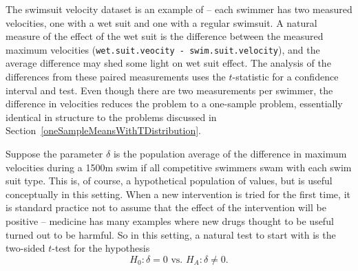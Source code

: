 The swimsuit velocity dataset is an example of  -- each swimmer has two measured velocities, one with a wet suit and one with a regular swimsuit.  A natural measure of the effect of the wet suit is the difference between the measured maximum velocities (\texttt{wet.suit.veocity - swim.suit.velocity}), and the average difference may shed some light on wet suit effect.  The analysis of the differences from these paired measurements uses the $t$-statistic for a confidence interval and test.  Even though there are two measurements per swimmer, the difference in velocities reduces the problem to a one-sample problem, essentially identical in structure to the problems discussed in Section~\ref{oneSampleMeansWithTDistribution}.

Suppose the parameter $\delta$ is the population average of the difference in maximum velocities during a 1500m swim if all competitive swimmers swam with each swim suit type.  This is, of course, a hypothetical population of values, but is useful conceptually in this setting.  When a new intervention is tried for the first time, it is standard practice not to assume that the effect of the intervention will be positive  -- medicine has many examples where new drugs thought to be useful turned out to be harmful.  So in this setting, a natural test to start with is the two-sided $t$-test for the hypothesis
\[
    H_0: \delta = 0 \text{  vs.  } H_A: \delta \neq 0.
\]

